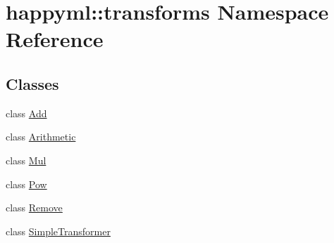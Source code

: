 \hypertarget{namespacehappyml_1_1transforms}{}\section{happyml\+:\+:transforms Namespace Reference}
\label{namespacehappyml_1_1transforms}
\subsection*{Classes}
\begin{DoxyCompactItemize}
\item 
class \hyperlink{classhappyml_1_1transforms_1_1Add}{Add}
\item 
class \hyperlink{classhappyml_1_1transforms_1_1Arithmetic}{Arithmetic}
\item 
class \hyperlink{classhappyml_1_1transforms_1_1Mul}{Mul}
\item 
class \hyperlink{classhappyml_1_1transforms_1_1Pow}{Pow}
\item 
class \hyperlink{classhappyml_1_1transforms_1_1Remove}{Remove}
\item 
class \hyperlink{classhappyml_1_1transforms_1_1SimpleTransformer}{Simple\+Transformer}
\end{DoxyCompactItemize}
